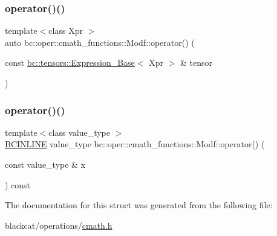 \mbox{\label{structbc_1_1oper_1_1cmath__functions_1_1Modf_af142ccee1997e1a25ef160a3549b5d69}} 
\subsubsection{\texorpdfstring{operator()()}{operator()()}\hspace{0.1cm}{\footnotesize\ttfamily [2/3]}}
{\footnotesize\ttfamily template$<$class Xpr $>$ \\
auto bc\+::oper\+::cmath\+\_\+functions\+::\+Modf\+::operator() (\begin{DoxyParamCaption}\item[{const \hyperlink{classbc_1_1tensors_1_1Expression__Base}{bc\+::tensors\+::\+Expression\+\_\+\+Base}$<$ Xpr $>$ \&}]{tensor }\end{DoxyParamCaption})\hspace{0.3cm}{\ttfamily [inline]}}

\mbox{\label{structbc_1_1oper_1_1cmath__functions_1_1Modf_ad8cf9552e39fffaf031aaf33b1360f77}} 
\subsubsection{\texorpdfstring{operator()()}{operator()()}\hspace{0.1cm}{\footnotesize\ttfamily [3/3]}}
{\footnotesize\ttfamily template$<$class value\+\_\+type $>$ \\
\hyperlink{common_8h_a6699e8b0449da5c0fafb878e59c1d4b1}{B\+C\+I\+N\+L\+I\+NE} value\+\_\+type bc\+::oper\+::cmath\+\_\+functions\+::\+Modf\+::operator() (\begin{DoxyParamCaption}\item[{const value\+\_\+type \&}]{x }\end{DoxyParamCaption}) const\hspace{0.3cm}{\ttfamily [inline]}}



The documentation for this struct was generated from the following file\+:\begin{DoxyCompactItemize}
\item 
blackcat/operations/\hyperlink{cmath_8h}{cmath.\+h}\end{DoxyCompactItemize}
